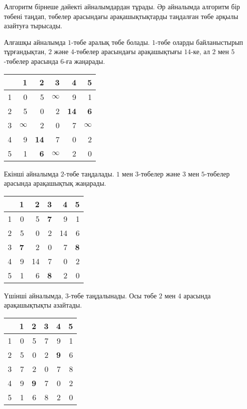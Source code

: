 Алгоритм бірнеше дәйекті айналымдардан тұрады.
Әр айналымда алгоритм бір төбені таңдап, төбелер
арасындағы арақашықтықтарды таңдалған төбе арқылы
азайтуға тырысады.

Алғашқы айналымда $1$-төбе аралық төбе болады. $1$-төбе оларды байланыстырып тұрғандықтан, $2$ және $4$-төбелер арасындағы арақашықтығы $14$-ке,
ал $2$ мен $5$-төбелер арасында $6$-ға жаңарады.

\begin{center}
\begin{tabular}{r|rrrrr}
 & 1 & 2 & 3 & 4 & 5 \\
\hline
1 & 0 & 5 & $\infty$ & 9 & 1 \\
2 & 5 & 0 & 2 & \textbf{14} & \textbf{6} \\
3 & $\infty$ & 2 & 0 & 7 & $\infty$ \\
4 & 9 & \textbf{14} & 7 & 0 & 2 \\
5 & 1 & \textbf{6} & $\infty$ & 2 & 0 \\
\end{tabular}
\end{center}
\vspace{10pt}

Екінші айналымда $2$-төбе таңдалады.
$1$ мен $3$-төбелер және $3$ мен $5$-төбелер арасында арақашықтық жаңарады.

\begin{center}
\begin{tabular}{r|rrrrr}
 & 1 & 2 & 3 & 4 & 5 \\
\hline
1 & 0 & 5 & \textbf{7} & 9 & 1 \\
2 & 5 & 0 & 2 & 14 & 6 \\
3 & \textbf{7} & 2 & 0 & 7 & \textbf{8} \\
4 & 9 & 14 & 7 & 0 & 2 \\
5 & 1 & 6 & \textbf{8} & 2 & 0 \\
\end{tabular}
\end{center}
\vspace{10pt}

Үшінші айналымда, $3$-төбе таңдалынады.
Осы төбе $2$ мен $4$ арасында арақашықтықты азайтады.

\begin{center}
\begin{tabular}{r|rrrrr}
 & 1 & 2 & 3 & 4 & 5 \\
\hline
1 & 0 & 5 & 7 & 9 & 1 \\
2 & 5 & 0 & 2 & \textbf{9} & 6 \\
3 & 7 & 2 & 0 & 7 & 8 \\
4 & 9 & \textbf{9} & 7 & 0 & 2 \\
5 & 1 & 6 & 8 & 2 & 0 \\
\end{tabular}
\end{center}
\vspace{10pt}

